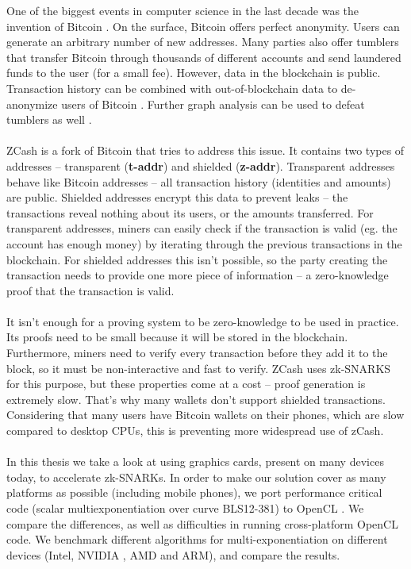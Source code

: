 One of the biggest events in computer science in the last decade was the invention of Bitcoin \cite{nakamoto2008bitcoin}. On the surface, Bitcoin offers perfect anonymity. Users can generate an arbitrary number of new addresses. Many parties also offer tumblers that transfer Bitcoin through thousands of different accounts and send laundered funds to the user (for a small fee). However, data in the blockchain is public. Transaction history can be combined with out-of-blockchain data to de-anonymize users of Bitcoin \cite{biryukov2014deanonymisation}. Further graph analysis can be used to defeat tumblers as well \cite{de2017analysis}.\\
\\
ZCash \cite{zcashprotocol} is a fork of Bitcoin that tries to address this issue. It contains two types of addresses -- transparent (\textbf{t-addr}) and shielded (\textbf{z-addr}). Transparent addresses behave like Bitcoin addresses -- all transaction history (identities and amounts) are public. Shielded addresses encrypt this data to prevent leaks -- the transactions reveal nothing about its users, or the amounts transferred. For transparent addresses, miners can easily check if the transaction is valid (eg. the account has enough money) by iterating through the previous transactions in the blockchain. For shielded addresses this isn't possible, so the party creating the transaction needs to provide one more piece of information -- a zero-knowledge proof that the transaction is valid. \\
\\
It isn't enough for a proving system to be zero-knowledge to be used in practice. Its proofs need to be small because it will be stored in the blockchain. Furthermore, miners need to verify every transaction before they add it to the block, so it must be non-interactive and fast to verify. ZCash uses zk-SNARKS for this purpose, but these properties come at a cost -- proof generation is extremely slow. That's why many wallets don't support shielded transactions. Considering that many users have Bitcoin wallets on their phones, which are slow compared to desktop CPUs, this is preventing more widespread use of zCash.\\
\\
In this thesis we take a look at using graphics cards, present on many devices today, to accelerate zk-SNARKs. In order to make our solution cover as many platforms as possible (including mobile phones), we port performance critical code (scalar multiexponentiation over curve BLS12-381) to OpenCL \cite{stone2010opencl}. We compare the differences, as well as difficulties in running cross-platform OpenCL code. We benchmark different algorithms for multi-exponentiation on different devices (Intel, NVIDIA , AMD and ARM), and compare the results.\\
